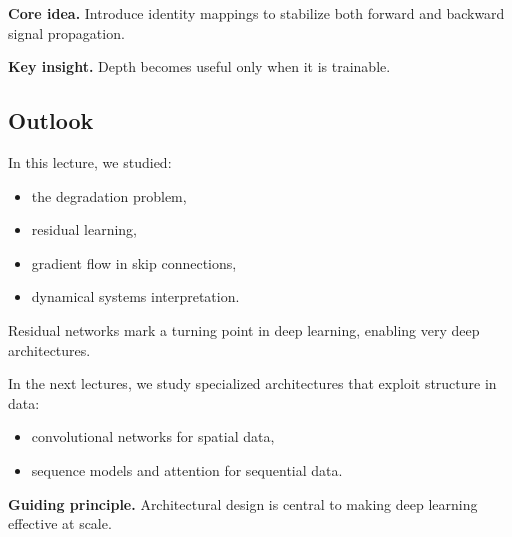 \noindent
\textbf{Core idea.}  
Introduce identity mappings to stabilize both forward and backward signal propagation.

\medskip

\noindent
\textbf{Key insight.}  
Depth becomes useful only when it is trainable.

\subsection{Outlook}

In this lecture, we studied:

\begin{itemize}
    \item the degradation problem,
    \item residual learning,
    \item gradient flow in skip connections,
    \item dynamical systems interpretation.
\end{itemize}

\medskip

\noindent
Residual networks mark a turning point in deep learning, enabling very deep architectures.

\medskip

\noindent
In the next lectures, we study specialized architectures that exploit structure in data:

\begin{itemize}
    \item convolutional networks for spatial data,
    \item sequence models and attention for sequential data.
\end{itemize}

\medskip

\noindent
\textbf{Guiding principle.}  
Architectural design is central to making deep learning effective at scale.